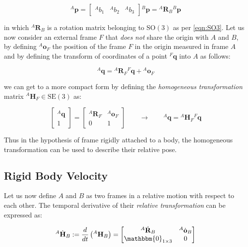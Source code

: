 \begin{equation}
    {}^A\mathbf{p} = \begin{bmatrix} {}^Ab_1 & {}^Ab_2 & {}^Ab_3 \end{bmatrix} {}^B \mathbf{p} = {}^A \mathbf{R}_B {}^B\mathbf{p}
\end{equation}

in which ${}^A\mathbf{R}_B$ is a rotation matrix belonging to $\mathrm{SO}(3)$ as per \cref{eqn:SO3}. Let us now consider an external frame $F$ that \textit{does not} share the origin with $A$ and $B$, by defining ${}^A\mathbf{o}_F$ the position of the frame $F$ in the origin measured in frame $A$ and by defining the transform of coordinates of a point ${}^F\mathbf{q}$ into $A$ as follows:

\begin{equation}
    {}^A \mathbf{q} = {}^A \mathbf{R}_F {}^F \mathbf{q} + {}^A \mathbf{o}_F
\end{equation}

we can get to a more compact form by defining the \textit{homogeneous transformation} matrix ${}^A\mathbf{H}_F \in \mathrm{SE}(3)$ as:

\begin{equation}
    \begin{bmatrix}
        {}^A \mathbf{q} \\ 1
    \end{bmatrix} =
    \begin{bmatrix}
        {}^A \mathbf{R}_F & {}^A \mathbf{o}_F \\ 0 & 1
    \end{bmatrix} \qquad \rightarrow \qquad {}^A\mathbf{q} = {}^A \mathbf{H}_F {}^F \mathbf{q}
\end{equation}

Thus in the hypothesis of frame rigidly attached to a body, the homogeneous transformation can be used to describe their relative pose.

\subsection{Rigid Body Velocity}

Let us now define $A$ and $B$ as two frames in a relative motion with respect to each other. The temporal derivative of their \textit{relative transformation} can be expressed as:

\begin{equation}
    \label{eqn:transformation_derivative}
    {}^A\dot{\mathbf{H}}_B := \frac{d}{dt} \left( {}^A\mathbf{H} _B \right) =
    \begin{bmatrix}
        {}^A\dot{\mathbf{R}}_B    & {}^A\dot{\mathbf{o}}_B \\
        \mathbbm{0} _{1 \times 3} & 0
    \end{bmatrix}
\end{equation}

